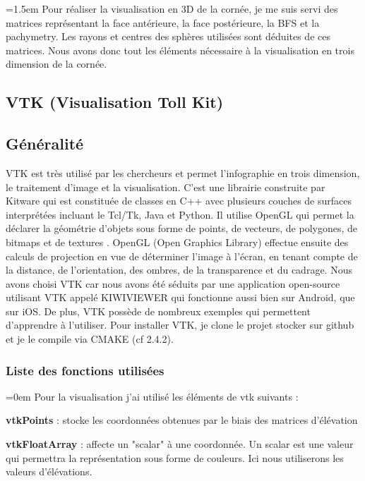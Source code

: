 \documentclass[a4paper,12pt]{article}
\begin{document}
\vspace{0.25cm}
\parindent=1.5em
 Pour réaliser la visualisation en 3D de la cornée, je me suis servi des matrices représentant la face antérieure, la face postérieure, la BFS et la pachymetry. Les rayons et centres des sphères utilisées sont déduites de ces matrices. Nous avons donc tout les éléments nécessaire à la visualisation en trois dimension de la cornée.

	\subsection{VTK (Visualisation Toll Kit)}
		\subsection{Généralité}
	 VTK est très utilisé par les chercheurs et permet l'infographie en trois dimension, le traitement d'image et la visualisation. C'est une librairie construite par Kitware qui est constituée de classes en C++ avec plusieurs couches de surfaces interprétées incluant le Tcl/Tk, Java et Python. Il utilise OpenGL qui permet la déclarer la géométrie d'objets sous forme de points, de vecteurs, de polygones, de bitmaps et de textures \cite{vtk}. OpenGL (Open Graphics Library) effectue ensuite des calculs de projection en vue de déterminer l'image à l'écran, en tenant compte de la distance, de l'orientation, des ombres, de la transparence et du cadrage. Nous avons choisi VTK car nous avons été séduits par une application open-source utilisant VTK appelé KIWIVIEWER qui fonctionne aussi bien sur Android, que sur iOS. De plus, VTK possède de nombreux exemples qui permettent d'apprendre à l'utiliser. Pour installer VTK, je clone le projet stocker sur github et je le compile via CMAKE (cf 2.4.2).

	 
		\subsubsection{Liste des fonctions utilisées}
\parindent=0em Pour la visualisation j'ai utilisé les éléments de vtk suivants :
\vspace{0.25cm}

\textbf{vtkPoints}	: stocke les coordonnées obtenues par le biais des matrices d'élévation 
\vspace{0.25cm}

\textbf{vtkFloatArray} : affecte un "scalar" à une coordonnée. Un scalar est une valeur qui permettra la représentation sous forme de couleurs. Ici nous utiliserons les valeurs d'élévations.
\vspace{0.15cm}
\end{document}
